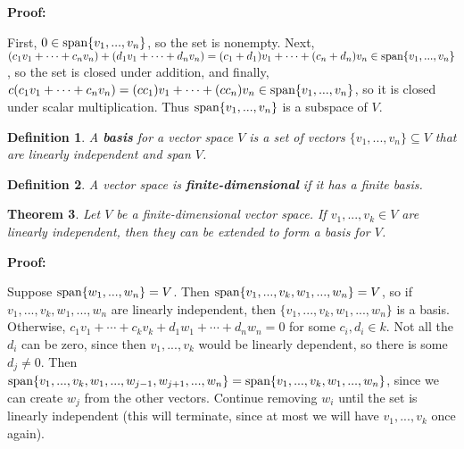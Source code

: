 \documentclass{article}
\theoremstyle{colontheorem}
\newtheorem{theorem}{Theorem}[section]
\newtheorem{definition}[theorem]{Definition}
\newcommand{\Span}{\textnormal{span}}
\newenvironment{Theorem}
{
	\begin{mdframed}[backgroundcolor=TheoremOrange!10]
	\begin{theorem}
}
{
	\end{theorem}
	\end{mdframed}
	
	\vspace{.15in}
}
\newenvironment{Def}
{
	\begin{mdframed}[backgroundcolor=DefGreen!10]
	\begin{definition}
}
{
	\end{definition}
	\end{mdframed}
	
	\vspace{.15in}
}
\newenvironment{Proof}
{
	\vspace{-.3in}
	
	\begin{mdframed}[backgroundcolor=ProofPurple!10]
	\textbf{Proof:}%
}
{
	\end{mdframed}
	
	\vspace{.15in}
}
\begin{document}
\begin{Proof}
	First, $0 \in \Span \{v_1, ..., v_n\}$, so the set is nonempty. Next, $(c_1 v_1 + \cdots + c_n v_n) + (d_1 v_1 + \cdots + d_n v_n) = (c_1 + d_1) v_1 + \cdots + (c_n + d_n) v_n \in \Span \{v_1, ..., v_n\}$, so the set is closed under addition, and finally, $c(c_1 v_1 + \cdots + c_n v_n) = (c c_1) v_1 + \cdots + (c c_n) v_n \in \Span \{v_1, ..., v_n\}$, so it is closed under scalar multiplication. Thus $\Span \{v_1, ..., v_n\}$ is a subspace of $V$.
	
\end{Proof}



\begin{Def}
	
	A \textbf{basis} for a vector space $V$ is a set of vectors $\{v_1, ..., v_n\} \subseteq V$ that are linearly independent and span $V$.
	
\end{Def}



\begin{Def}
	
	A vector space is \textbf{finite-dimensional} if it has a finite basis.
	
\end{Def}



\begin{Theorem}
	
	Let $V$ be a finite-dimensional vector space. If $v_1, ..., v_k \in V$ are linearly independent, then they can be extended to form a basis for $V$.
	
\end{Theorem}



\begin{Proof}
	Suppose $\Span \{w_1, ..., w_n\} = V$. Then $\Span \{v_1, ..., v_k, w_1, ..., w_n\} = V$, so if \linebreak $v_1, ..., v_k, w_1, ..., w_n$ are linearly independent, then $\{v_1, ..., v_k, w_1, ..., w_n\}$ is a basis. Otherwise, $c_1 v_1 + \cdots + c_k v_k + d_1 w_1 + \cdots + d_n w_n = 0$ for some $c_i , d_i \in k$. Not all the $d_i$ can be zero, since then $v_1, ..., v_k$ would be linearly dependent, so there is some $d_j \neq 0$. Then $\Span \{v_1, ..., v_k, w_1, ..., w_{j-1}, w_{j+1}, ..., w_n\} = \Span \{v_1, ..., v_k, w_1, ..., w_n\}$, since we can create $w_j$ from the other vectors. Continue removing $w_i$ until the set is linearly independent (this will terminate, since at most we will have $v_1, ..., v_k$ once again).
	
\end{Proof}
\end{document}
